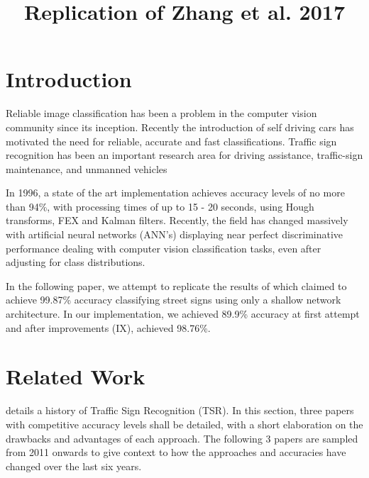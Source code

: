 \documentclass[conference]{IEEEtran}
\begin{document}
\title{Replication of Zhang et al. 2017 \cite{ZhangsMainPaper}}
\author{
\and
{}
 }

\maketitle

\IEEEpeerreviewmaketitle

\section{Introduction}

Reliable image classification has been a problem in the computer vision community since its inception. Recently the introduction of self driving cars has motivated the need for  reliable, accurate and fast classifications. Traffic sign recognition has been an important research area for driving assistance, traffic-sign maintenance, and unmanned vehicles \linebreak

In 1996, a state of the art implementation \cite{Old2003Paper} achieves accuracy levels of no more than 94\%, with processing times of up to 15 - 20 seconds, using Hough transforms, FEX and Kalman filters. Recently, the field has changed massively with artificial neural networks (ANN's) displaying near perfect discriminative performance dealing with computer vision classification tasks, even after adjusting for class distributions. \linebreak

In the following paper, we attempt to replicate the results of \cite{ZhangsMainPaper} which claimed to achieve 99.87\% accuracy classifying street signs using only a shallow network architecture. In our implementation, we achieved 89.9\% accuracy at first attempt and after improvements (IX), achieved 98.76\%.

\section{Related Work}

\cite{ZhangsMainPaper} details a history of Traffic Sign Recognition (TSR). In this section, three papers with competitive accuracy levels shall be detailed, with a short elaboration on the drawbacks and advantages of each approach. The following 3 papers are sampled from 2011 onwards to give context to how the approaches and accuracies have changed over the last six years. \linebreak
\end{document}

